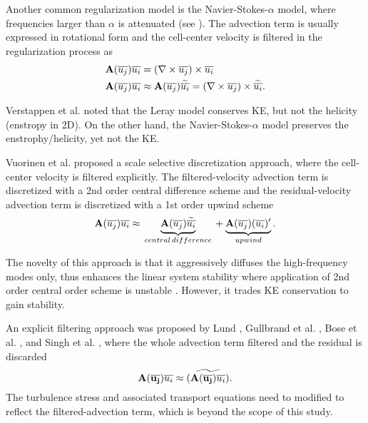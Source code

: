 Another common regularization model is the Navier-Stokes-$\alpha$ model, where frequencies larger than $\alpha$ is attenuated (see \cite{holm1998, montgomery2002, marsden2003}). The advection term is usually expressed in rotational form and the cell-center velocity is filtered in the regularization process as
\begin{align}
\begin{split}
{\mathbf{A}(\overline{u_j})} \overline{u_i} &= (\nabla \times \overline{u_j}) \times \overline{u_i}
\\
{\mathbf{A}(\overline{u_j})} \overline{u_i} & \approx 
{\mathbf{A} ( \overline{u_j}) } \widetilde{ \overline{u_i}} =(\nabla \times \overline{u_j}) \times \widetilde{ \overline{u_i}}.
\end{split}
\label{eqn:NSalphaReg}
\end{align}

Verstappen et al. \cite{verstappen2008} noted that the Leray model conserves KE, but not the helicity (enstropy in 2D). On the other hand, the Navier-Stokes-$\alpha$ model preserves the enstrophy/helicity, yet not the KE.

Vuorinen et al. \cite{vuorinen2012} proposed a scale selective discretization approach, where the cell-center velocity is filtered explicitly. The filtered-velocity advection term is discretized with a 2nd order central difference scheme and the residual-velocity advection term is discretized with a 1st order upwind scheme 
\begin{equation}
{\mathbf{A}({\overline{u_j}})} \overline{u_i} \approx 
\\
\underbrace{\mathbf{A}({\overline{u_j}}) \widetilde{\overline{u_i}}}_{central \, difference}
\\
+\underbrace{ \mathbf{A}({\overline{u_j}}) (\overline{u_i} )^{\prime}}_{upwind}.
\label{eqn:scaleSelectiveDisc}
\end{equation}

The novelty of this approach is that it aggressively diffuses the high-frequency modes only, thus enhances the linear system stability where application of 2nd order central order scheme is unstable \cite{han2020}. However, it trades KE conservation to gain stability.

An explicit filtering approach was proposed by Lund \cite{lund2003}, Gullbrand et al. \cite{gullbrand2003}, Bose et al. \cite{bose2010, bose2010a}, and Singh et al. \cite{singh2012}, where the whole advection term filtered and the residual is discarded
\begin{equation}
\mathbf{A}(\mathbf{\overline{u_j}}) \overline{u_i} \approx 
\\
\widetilde{
 \left( \mathbf{A}(\mathbf{\overline{u_j}}) \overline{u_i}\right)
}.
\label{eqn:explicitAdvFilter}
\end{equation}
The turbulence stress and associated transport equations need to modified to reflect the filtered-advection term, which is beyond the scope of this study.

